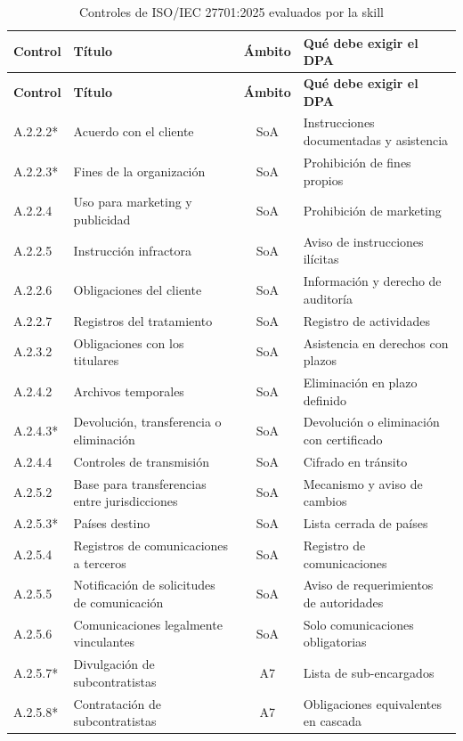 \documentclass[12pt,letterpaper]{article}
\begin{document}
\begin{small}
\begin{longtable}{@{}l L{5.6cm} c L{5.0cm}@{}}
\caption{Controles de ISO/IEC 27701:2025 evaluados por la skill}\label{tab:controles}\\
\toprule
\textbf{Control} & \textbf{Título} & \textbf{Ámbito} & \textbf{Qué debe exigir el DPA} \\
\midrule
\endfirsthead
\toprule
\textbf{Control} & \textbf{Título} & \textbf{Ámbito} & \textbf{Qué debe exigir el DPA} \\
\midrule
\endhead
\bottomrule
\endfoot
A.2.2.2* & Acuerdo con el cliente & SoA & Instrucciones documentadas y asistencia \\
A.2.2.3* & Fines de la organización & SoA & Prohibición de fines propios \\
A.2.2.4 & Uso para marketing y publicidad & SoA & Prohibición de marketing \\
A.2.2.5 & Instrucción infractora & SoA & Aviso de instrucciones ilícitas \\
A.2.2.6 & Obligaciones del cliente & SoA & Información y derecho de auditoría \\
A.2.2.7 & Registros del tratamiento & SoA & Registro de actividades \\
A.2.3.2 & Obligaciones con los titulares & SoA & Asistencia en derechos con plazos \\
A.2.4.2 & Archivos temporales & SoA & Eliminación en plazo definido \\
A.2.4.3* & Devolución, transferencia o eliminación & SoA & Devolución o eliminación con certificado \\
A.2.4.4 & Controles de transmisión & SoA & Cifrado en tránsito \\
A.2.5.2 & Base para transferencias entre jurisdicciones & SoA & Mecanismo y aviso de cambios \\
A.2.5.3* & Países destino & SoA & Lista cerrada de países \\
A.2.5.4 & Registros de comunicaciones a terceros & SoA & Registro de comunicaciones \\
A.2.5.5 & Notificación de solicitudes de comunicación & SoA & Aviso de requerimientos de autoridades \\
A.2.5.6 & Comunicaciones legalmente vinculantes & SoA & Solo comunicaciones obligatorias \\
A.2.5.7* & Divulgación de subcontratistas & A7 & Lista de sub-encargados \\
A.2.5.8* & Contratación de subcontratistas & A7 & Obligaciones equivalentes en cascada \\

\end{longtable}
\end{small}
\end{document}
